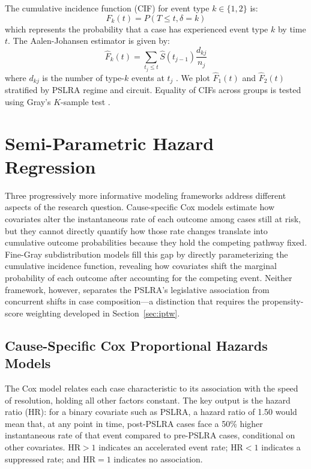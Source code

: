 The cumulative incidence function (CIF) for event type $k \in \{1,2\}$ is:
\begin{equation}
F_k(t) = P(T \leq t, \delta = k)
\end{equation}
which represents the probability that a case has experienced event type $k$ by time $t$. The Aalen-Johansen estimator is given by:
\begin{equation}
\hat{F}_k(t) = \sum_{t_j \leq t} \hat{S}(t_{j-1}) \frac{d_{kj}}{n_j}
\end{equation}
where $d_{kj}$ is the number of type-$k$ events at $t_j$ \citep{aalen1978}. We plot $\hat{F}_1(t)$ and $\hat{F}_2(t)$ stratified by PSLRA regime and circuit. Equality of CIFs across groups is tested using Gray's $K$-sample test \citep{gray1988}.

\section{Semi-Parametric Hazard Regression}
\label{sec:hazard_regression}

Three progressively more informative modeling frameworks
address different aspects of the research question.
Cause-specific Cox models estimate how covariates alter
the instantaneous rate of each outcome among cases still at
risk, but they cannot directly quantify how those rate
changes translate into cumulative outcome probabilities
because they hold the competing pathway fixed. Fine-Gray
subdistribution models fill this gap by directly
parameterizing the cumulative incidence function, revealing
how covariates shift the marginal probability of each
outcome after accounting for the competing event. Neither
framework, however, separates the PSLRA's legislative
association from concurrent shifts in case
composition---a distinction that requires the propensity-score
weighting developed in Section~\ref{sec:iptw}.

\subsection{Cause-Specific Cox Proportional Hazards Models}

The Cox model relates each case characteristic to its association
with the speed of resolution, holding all other factors constant.
The key output is the hazard ratio (HR): for a binary
covariate such as PSLRA, a hazard ratio of 1.50 would mean that,
at any point in time, post-PSLRA cases face a 50\% higher
instantaneous rate of that event compared to pre-PSLRA cases,
conditional on other covariates. $\text{HR} > 1$ indicates an
accelerated event rate; $\text{HR} < 1$ indicates a suppressed
rate; and $\text{HR} = 1$ indicates no association.

